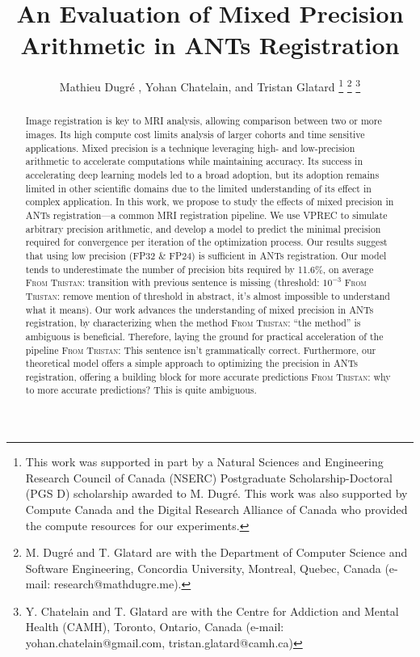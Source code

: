 \documentclass[journal,twoside,web]{ieeecolor}
\newcommand{\TG}[1]{\color{blue}\textsc{From Tristan: }#1\color{black}}
\begin{document}
\title{An Evaluation of Mixed Precision Arithmetic in ANTs Registration}
\author{Mathieu Dugr\'e , Yohan Chatelain, and Tristan Glatard
\thanks{This work was supported in part by a Natural Sciences and Engineering Research Council of Canada (NSERC) Postgraduate Scholarship-Doctoral (PGS D) scholarship awarded to M. Dugr\'e. This work was also supported by Compute Canada and the Digital Research Alliance of Canada who provided the compute resources for our experiments.}
\thanks{M. Dugr\'e and T. Glatard are with the Department of Computer Science and Software Engineering, Concordia University, Montreal, Quebec, Canada (e-mail: research@mathdugre.me).}
\thanks{Y. Chatelain and T. Glatard are with the Centre for Addiction and Mental Health (CAMH), Toronto, Ontario, Canada (e-mail: {yohan.chatelain@gmail.com, tristan.glatard@camh.ca})}}

\maketitle

\begin{abstract}
	Image registration is key to MRI analysis, allowing comparison between two
	or more images. Its high compute cost limits analysis of larger cohorts and
	time sensitive applications. Mixed precision is a technique leveraging high-
	and low-precision arithmetic to accelerate computations while maintaining
	accuracy. Its success in accelerating deep learning models led to a broad
	adoption, but its adoption remains limited in other scientific domains due
	to the limited understanding of its effect in complex application. In this
	work, we propose to study the effects of mixed precision in ANTs
	registration---a common MRI registration pipeline. We use VPREC to simulate
	arbitrary precision arithmetic, and develop a model to predict the minimal
	precision required for convergence per iteration of the optimization
	process. Our results suggest that using low precision (FP32 \& FP24) is
	sufficient in ANTs registration. Our model tends to underestimate the number
	of precision bits required by 11.6\%, on average \TG{transition with
	previous sentence is missing} (threshold: $10^{-3}$ \TG{remove mention of
	threshold in abstract, it's almost impossible to understand what it means}).
	Our work advances the understanding of mixed precision in ANTs registration,
	by characterizing when the method \TG{``the method'' is ambiguous} is
	beneficial. Therefore, laying the ground for practical acceleration of the
	pipeline \TG{This sentence isn't grammatically correct}. Furthermore, our
	theoretical model offers a simple approach to optimizing the precision in
	ANTs registration, offering a building block for more accurate predictions
	\TG{why to more accurate predictions? This is quite ambiguous}.
\end{abstract}
\end{document}
